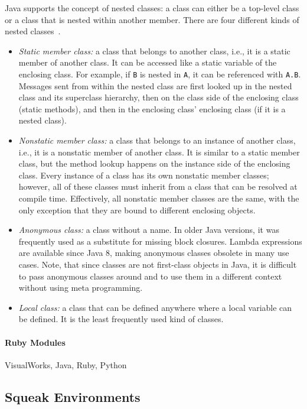 Java supports the concept of nested classes: a class can either be a top-level class or a class that is nested within another member. There are four different kinds of nested classes~\cite{Bloch:2008:EJ:1377533}.
\begin{itemize}
	\item \emph{Static member class:} a class that belongs to another class, i.e., it is a static member of another class. It can be accessed like a static variable of the enclosing class. For example, if \texttt{B} is nested in \texttt{A}, it can be referenced with \texttt{A.B}. Messages sent from within the nested class are first looked up in the nested class and its superclass hierarchy, then on the class side of the enclosing class (static methods), and then in the enclosing class' enclosing class (if it is a nested class).
	\item \emph{Nonstatic member class:} a class that belongs to an instance of another class, i.e., it is a nonstatic member of another class. It is similar to a static member class, but the method lookup happens on the instance side of the enclosing class. Every instance of a class has its own nonstatic member classes; however, all of these classes must inherit from a class that can be resolved at compile time. Effectively, all nonstatic member classes are the same, with the only exception that they are bound to different enclosing objects.
	\item \emph{Anonymous class:} a class without a name. In older Java versions, it was frequently used as a substitute for missing block closures. Lambda expressions are available since Java 8, making anonymous classes obsolete in many use cases. Note, that since classes are not first-class objects in Java, it is difficult to pass anonymous classes around and to use them in a different context without using meta programming.
	\item \emph{Local class:} a class that can be defined anywhere where a local variable can be defined. It is the least frequently used kind of classes.
\end{itemize}

\paragraph{Ruby Modules}
VisualWorks, Java, Ruby, Python

\subsection{Squeak Environments}

